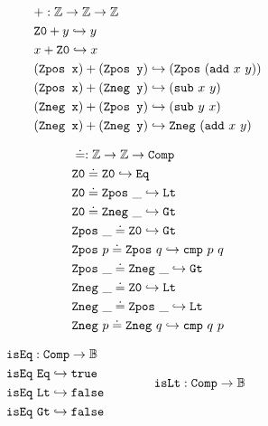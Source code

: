 \begin{figure}
\centering
\begin{minipage}[t]{0.48\textwidth}
\begin{align*}
&+: \mathbb{Z} \rightarrow \mathbb{Z} \rightarrow \mathbb{Z} \\
& \texttt{Z0} + y \hookrightarrow y \\
& x + \texttt{Z0} \hookrightarrow x \\
& (\texttt{Zpos x}) + (\texttt{Zpos y}) \hookrightarrow (\texttt{Zpos}~(\texttt{add}~x~y))  \\
& (\texttt{Zpos x}) + (\texttt{Zneg y}) \hookrightarrow (\texttt{sub}~x~y)  \\
& (\texttt{Zneg x}) + (\texttt{Zpos y}) \hookrightarrow (\texttt{sub}~y~x)  \\
& (\texttt{Zneg x}) + (\texttt{Zneg y}) \hookrightarrow \texttt{Zneg}~(\texttt{add}~x~y)
\end{align*}
\hfill
\end{minipage}
\begin{minipage}[t]{0.48\textwidth}
\begin{align*}
&\doteq : \mathbb{Z} \rightarrow \mathbb{Z} \rightarrow \texttt{Comp} \\
& \texttt{Z0} \doteq \texttt{Z0} \hookrightarrow \texttt{Eq} \\
& \texttt{Z0} \doteq \texttt{Zpos}~\_ \hookrightarrow \texttt{Lt} \\
& \texttt{Z0} \doteq \texttt{Zneg}~\_ \hookrightarrow \texttt{Gt} \\
& \texttt{Zpos}~\_ \doteq \texttt{Z0} \hookrightarrow \texttt{Gt} \\
& \texttt{Zpos}~p \doteq \texttt{Zpos}~q \hookrightarrow \texttt{cmp}~p~q \\
& \texttt{Zpos}~\_ \doteq \texttt{Zneg}~\_ \hookrightarrow \texttt{Gt} \\
& \texttt{Zneg}~\_ \doteq \texttt{Z0} \hookrightarrow \texttt{Lt} \\
& \texttt{Zneg}~\_ \doteq \texttt{Zpos}~\_ \hookrightarrow \texttt{Lt} \\
& \texttt{Zneg}~p \doteq \texttt{Zneg}~q \hookrightarrow \texttt{cmp}~q~p
\end{align*}
\end{minipage}
\noindent
\[
\begin{array}{l@{\hspace{4em}}l@{\hspace{4em}}l}
\begin{aligned}
  &\tt{isEq} : \tt{Comp} \ra \bb{B} \\
  &\tt{isEq}~\tt{Eq} \re \tt{true} \\
  &\tt{isEq}~\tt{Lt} \re \tt{false} \\
  &\tt{isEq}~\tt{Gt} \re \tt{false} 
\end{aligned}
&
\begin{aligned}
  &\tt{isLt} : \tt{Comp} \ra \bb{B} \\

\end{aligned}
\end{array}\]
\end{figure}
